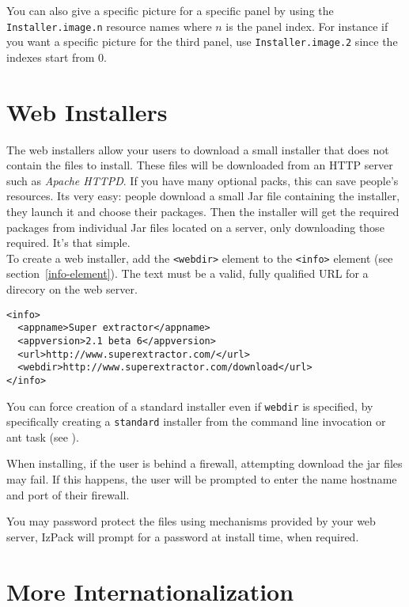 You can also give a specific picture for a specific panel by using the
\texttt{Installer.image.n} resource names where $n$ is the panel index. For
instance if you want a specific picture for the third panel, use
\texttt{Installer.image.2} since the indexes start from 0.\\

\section{Web Installers}
\label{webinstaller}

The web installers allow your users to download a small installer that
does not contain the files to install. These files will be downloaded
from an HTTP server such as \textit{Apache HTTPD}. If you have many
optional packs, this can save people's resources. Its very easy:
people download a small Jar file containing the installer, they launch
it and choose their packages. Then the installer will get the required
packages from individual Jar files located on a server, only
downloading those required. It's that simple.\\

To create a web installer, add the \texttt{<webdir>} element to the
\texttt{<info>} element (see section~\ref{info-element}). The text must
be a valid, fully qualified URL for a direcory on the web server.\\

\footnotesize
\begin{verbatim}
<info>
  <appname>Super extractor</appname>
  <appversion>2.1 beta 6</appversion>
  <url>http://www.superextractor.com/</url>
  <webdir>http://www.superextractor.com/download</url>
</info>
\end{verbatim}
\normalsize

You can force creation of a standard installer even if \texttt{webdir}
is specified, by specifically creating a \texttt{standard} installer
from the command line invocation or ant task (see
\label{ant-integration}).

When installing, if the user is behind a firewall, attempting download
the jar files may fail. If this happens, the user will be prompted to
enter the name hostname and port of their firewall.

You may password protect the files using mechanisms provided by your
web server, IzPack will prompt for a password at install time, when
required.

\section{More Internationalization}

